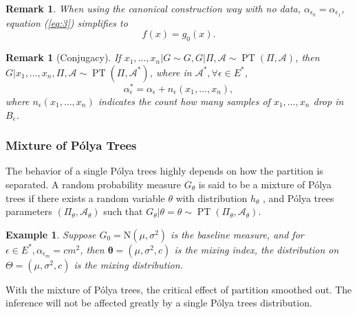 \documentclass[12pt]{article}
\newtheorem{rmk}[thm]{Remark}
\newtheorem{emp}[thm]{Example}
\newcommand{\polya}{P\'{o}lya}
\DeclareMathOperator{\pt}{PT}
\begin{document}
\begin{rmk}
When using the canonical construction way with no data,
$\alpha_{\epsilon_0 } = \alpha_{\epsilon_1}$, equation (\ref{eq:3})
simplifies to 
\begin{displaymath}
f(x) = g_0(x).
\end{displaymath}
\end{rmk}

\begin{rmk}[Conjugacy]
If $x_1, \ldots, x_n | G \sim G, G|\Pi, \mathcal{A} \sim \pt (\Pi,
\mathcal{A})$, then $G|x_1, \ldots, x_n , \Pi, \mathcal{A} \sim \pt
(\Pi, \mathcal{A}^{*})$, where in $\mathcal{A}^{*}, \forall \epsilon
\in E^{*}$, 
\begin{displaymath}
\alpha_{\epsilon}^{*} = \alpha_{\epsilon} + n_{\epsilon}(x_1, \ldots, x_n),
\end{displaymath}
where $n_{\epsilon}(x_1, \ldots, x_n)$ indicates the count how many
samples of $x_1, \ldots, x_n$ drop in $B_{\epsilon}$. 
\end{rmk}

\subsubsection{Mixture of \polya{} Trees}
The behavior of a single \polya{} trees highly depends on how the
partition is separated. A random probability measure $G_\theta$ is
said to be a mixture of \polya{} trees if there exists a random
variable $\theta$ with distribution $h_{\theta}$ , and \polya{} trees
parameters $(\Pi_{\theta}, \mathcal{A}_{\theta})$ such that
$G_{\theta} | \theta=\theta \sim \pt (\Pi_{\theta},
\mathcal{A}_{\theta})$.

\begin{emp}
Suppose $G_0 = \mathrm{N}(\mu, \sigma^2)$ is the baseline measure, and
for $\epsilon \in E^{*}, \alpha_{\epsilon_m} = cm^2 $, then
$\bm{\theta}= (\mu, \sigma^2, c)$ is the mixing index, the
distribution on $\Theta = (\mu, \sigma^2, c) $ is the mixing
distribution. 
\end{emp}
With the mixture of \polya{} trees, the critical effect of partition
smoothed out. The inference will not be affected greatly by a single
\polya{} trees distribution. 
\end{document}
